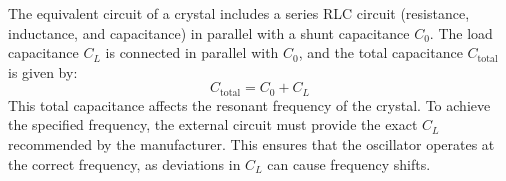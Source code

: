 The equivalent circuit of a crystal includes a series RLC circuit (resistance, inductance, and capacitance) in parallel with a shunt capacitance \( C_0 \). The load capacitance \( C_L \) is connected in parallel with \( C_0 \), and the total capacitance \( C_{\text{total}} \) is given by:
\[
C_{\text{total}} = C_0 + C_L
\]
This total capacitance affects the resonant frequency of the crystal. To achieve the specified frequency, the external circuit must provide the exact \( C_L \) recommended by the manufacturer. This ensures that the oscillator operates at the correct frequency, as deviations in \( C_L \) can cause frequency shifts.

